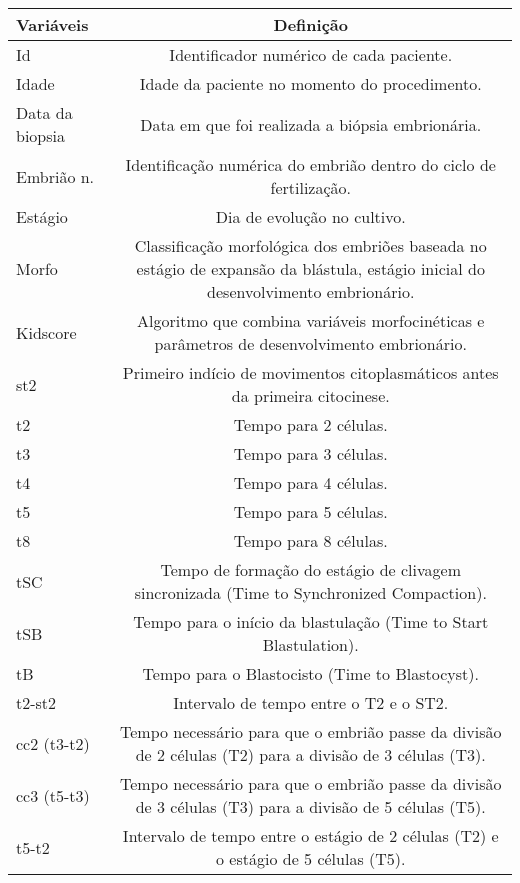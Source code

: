 \begin{table}[ht]
  \centering
  \begin{tabular}{|l|c|}
  \hline
  \textbf{Variáveis} & \textbf{Definição} \\ \hline
  Id & Identificador numérico de cada paciente. \\ \hline
  Idade & Idade da paciente no momento do procedimento. \\ \hline
  Data da biopsia & Data em que foi realizada a biópsia embrionária. \\ \hline
  Embrião n. & Identificação numérica do embrião dentro do ciclo de fertilização. \\ \hline
  Estágio & Dia de evolução no cultivo. \\ \hline
  Morfo & Classificação morfológica dos embriões baseada no estágio de expansão da blástula, estágio inicial do desenvolvimento embrionário. \\ \hline
  Kidscore & Algoritmo que combina variáveis morfocinéticas e parâmetros de desenvolvimento embrionário. \\ \hline
  st2 & Primeiro indício de movimentos citoplasmáticos antes da primeira citocinese. \\ \hline
  t2 & Tempo para 2 células. \\ \hline
  t3 & Tempo para 3 células. \\ \hline
  t4 & Tempo para 4 células. \\ \hline
  t5 & Tempo para 5 células. \\ \hline
  t8 & Tempo para 8 células. \\ \hline
  tSC & Tempo de formação do estágio de clivagem sincronizada (Time to Synchronized Compaction). \\ \hline
  tSB & Tempo para o início da blastulação (Time to Start Blastulation). \\ \hline
  tB & Tempo para o Blastocisto (Time to Blastocyst). \\ \hline
  t2-st2 & Intervalo de tempo entre o T2 e o ST2. \\ \hline
  cc2 (t3-t2) & Tempo necessário para que o embrião passe da divisão de 2 células (T2) para a divisão de 3 células (T3). \\ \hline
  cc3 (t5-t3) & Tempo necessário para que o embrião passe da divisão de 3 células (T3) para a divisão de 5 células (T5). \\ \hline
  t5-t2 & Intervalo de tempo entre o estágio de 2 células (T2) e o estágio de 5 células (T5). \\ \hline

\end{tabular}
\end{table}
